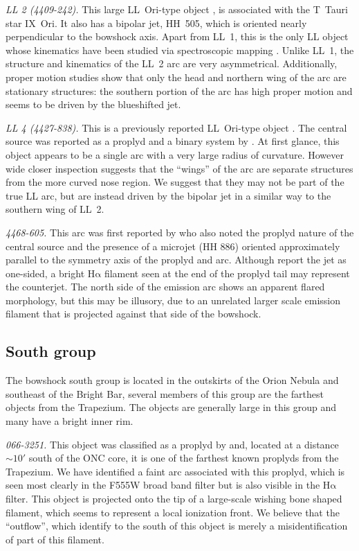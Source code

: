 \documentclass[iop, apj]{emulateapj}
\newcommand\ha{\ensuremath{\mathrm{H\alpha}}}
\renewcommand\clearpage{}
\begin{document}
\textit{LL 2 (4409-242).} This large LL~Ori-type object
\citep{Bally:2001a}, is associated with the T~Tauri star IX~Ori. It
also has a bipolar jet, HH~505, which is oriented nearly perpendicular
to the bowshock axis. Apart from LL~1, this is the only LL object
whose kinematics have been studied via spectroscopic mapping
\citep{Henney:2013a}. Unlike LL~1, the structure and kinematics of the
LL~2 arc are very asymmetrical.  Additionally, proper motion studies
\citep{Henney:2013a} show that only the head and northern wing of the
arc are stationary structures: the southern portion of the arc has
high proper motion and seems to be driven by the blueshifted jet.

\textit{LL 4 (4427-838).} This is a previously reported LL~Ori-type
object \citep{Bally:2001a}. The central source was reported as a
proplyd and a binary system by \citet{Bally:2006a}. At first glance,
this object appears to be a single arc with a very large radius of
curvature. However wide closer inspection suggests that the ``wings''
of the arc are separate structures from the more curved nose
region. We suggest that they may not be part of the true LL arc, but
are instead driven by the bipolar jet \citep{Bally:2006a} in a similar
way to the southern wing of LL~2.

\textit{4468-605.}  This arc was first reported by \citet{Bally:2006a}
who also noted the proplyd nature of the central source and the
presence of a microjet (HH 886) oriented approximately parallel to the
symmetry axis of the proplyd and arc.  Although \citet{Bally:2006a}
report the jet as one-sided, a bright \ha{} filament seen at the end
of the proplyd tail may represent the counterjet.  The north side of
the emission arc shows an apparent flared morphology, but this may be
illusory, due to an unrelated larger scale emission filament that is
projected against that side of the bowshock.

\clearpage
\subsection{South group}
\label{sec:s-group}



The bowshock south group is located in the outskirts of the Orion Nebula and southeast of the Bright Bar, several members of this group are the farthest objects from the Trapezium. The objects are generally large in this group and many have a bright inner rim.   

\textit{066-3251.} This object was classified as a proplyd by \citet{Ricci:2008a} and, located at a distance \(\sim 10'\) south of the ONC core, it is one of the farthest known proplyds from the Trapezium. We have identified a faint arc associated with this proplyd, which is seen most clearly in the F555W broad band filter but is also visible in the \ha{} filter. This object is projected onto the tip of a large-scale wishing bone shaped filament, which seems to represent a local ionization front. We believe that the ``outflow'', which \citet{Ricci:2008a} identify to the south of this object is merely a misidentification of part of this filament.  
\end{document}
